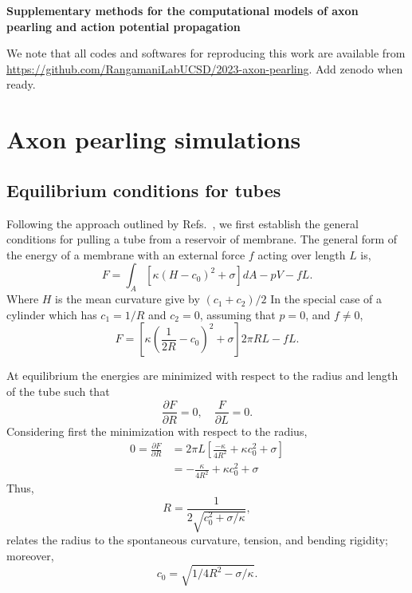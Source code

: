 \documentclass[11pt]{article}
\newcommand{\Red}[1]{{\color{red}#1}}
\begin{document}
\begin{centering}
    \textbf{\Large Supplementary methods for the computational models of axon pearling and action potential propagation}\\[3mm]
    
\end{centering}

We note that all codes and softwares for reproducing this work are available from \url{https://github.com/RangamaniLabUCSD/2023-axon-pearling}.
\Red{Add zenodo when ready}.

\section{Axon pearling simulations}
\subsection{Equilibrium conditions for tubes}
Following the approach outlined by Refs.~\cite{DerenyiEtAl2002,ShurerEtAl2019}, we first establish the general conditions for pulling a tube from a reservoir of membrane.
The general form of the energy of a membrane with an external force \(f\) acting over length \(L\) is,
\begin{equation}
    F = \int_A \left[\kappa(H - c_0)^2 + \sigma \right]dA - pV - fL.
\end{equation}
Where \(H\) is the mean curvature give by \((c_1 + c_2)/2\)
In the special case of a cylinder which has \(c_1 = 1/R\) and \(c_2 = 0\), assuming that \(p=0\), and \(f\neq 0\),
\begin{equation}
    F = \left[ \kappa\left(\frac{1}{2R} - c_0\right)^2 + \sigma\right] 2\pi RL - fL.
\end{equation}

At equilibrium the energies are minimized with respect to the radius and length of the tube such that
\begin{equation}
    \frac{\partial F}{\partial R} = 0,\quad \frac{F}{\partial L} =0.
\end{equation}
Considering first the minimization with respect to the radius,
\begin{align*}
    0 = \frac{\partial F}{\partial R} & = 2\pi L\left[\frac{-\kappa}{4R^2} + \kappa c_0^2 + \sigma\right] \\
                                      & = - \frac{\kappa}{4R^2} + \kappa c_0^2 + \sigma
\end{align*}
Thus,
\begin{equation}
    R = \frac{1}{2\sqrt{c_0^2 + \sigma/\kappa}},
\end{equation}
relates the radius to the spontaneous curvature, tension, and bending rigidity; moreover,
\begin{equation}
    c_0 = \sqrt{1/4R^2 - \sigma/\kappa}.
    \label{eq:spontaneous_curvature_relation}
\end{equation}
\end{document}
